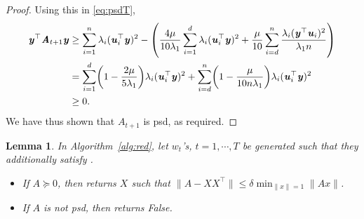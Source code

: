 \documentclass[11pt]{article}
\newtheorem{lemma}[theorem]{Lemma}
\let\originalleft\left
\let\originalright\right
\renewcommand{\left}{\mathopen{}\mathclose\bgroup\originalleft}
\renewcommand{\right}{\aftergroup\egroup\originalright}
\newcommand\uu{\boldsymbol{\mathit{u}}}
\newcommand\ww{\boldsymbol{\mathit{w}}}
\newcommand\yy{\boldsymbol{\mathit{y}}}
\newcommand\xx{\boldsymbol{\mathit{x}}}
\renewcommand\AA{\boldsymbol{\mathit{A}}}
\newcommand\XX{\boldsymbol{\mathit{X}}}
\begin{document}
\begin{proof}
Using this in \eqref{eq:psdT},
\begin{align*}
\yy^{\top}\AA_{t+1}\yy & \geq \sum_{i=1}^n \lambda_i (\uu_i^{\top}\yy)^2 - \left(\frac{4\mu}{10\lambda_1}\sum_{i=1}^d \lambda_i (\uu_i^{\top}\yy)^2 + \frac{\mu}{10}\sum_{i=d}^n \frac{\lambda_i(\yy^{\top}\uu_i)^2}{\lambda_1 n}\right)\\
& = \sum_{i=1}^d \left(1 - \frac{2\mu}{5\lambda_1}\right)\lambda_i (\uu_i^{\top}\yy)^2  + \sum_{i=d}^n \left(1 - \frac{\mu}{10n\lambda_1}\right)\lambda_i (\uu_i^{\top}\yy)^2  \\
& \geq 0.
\end{align*}
We have thus shown that $\AA_{t+1}$ is psd, as required.
\end{proof}


\begin{lemma}\label{lem:RedAns}
In Algorithm~\ref{alg:red}, let $\ww_t$'s, $t=1,\cdots, T$ be generated such that they additionally satisfy . 
\begin{itemize}
    \item If $\AA\succeq 0$, then  returns $\XX$ such that $\|\AA-\XX\XX^{\top}\|\leq \delta \min_{\|\xx\|=1}\|\AA\xx\|$. 
    \item If $\AA$ is not psd, then  returns {\sc False}.
\end{itemize}
\end{lemma}
\end{document}
